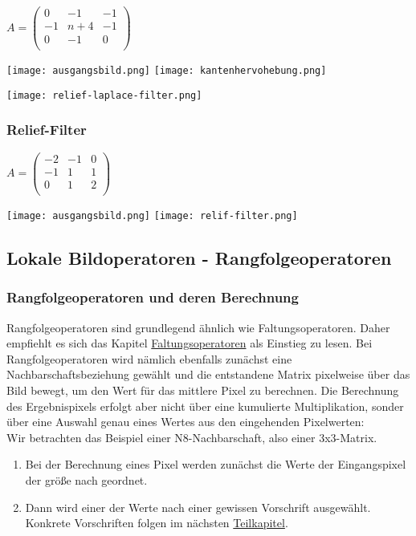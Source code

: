 $
    A
    =
    \begin{pmatrix}
        0  & -1    & -1 \\
        -1 & n + 4 & -1 \\
        0  & -1    & 0  \\
    \end{pmatrix}
$

\texttt{[image: ausgangsbild.png]}
\texttt{[image: kantenhervohebung.png]}

\texttt{[image: relief-laplace-filter.png]}

\subsubsection{Relief-Filter}

$
    A
    =
    \begin{pmatrix}
        -2 & -1 & 0 \\
        -1 & 1  & 1 \\
        0  & 1  & 2 \\
    \end{pmatrix}
$

\texttt{[image: ausgangsbild.png]}
\texttt{[image: relif-filter.png]}

\subsection{Lokale Bildoperatoren - Rangfolgeoperatoren}

\subsubsection{Rangfolgeoperatoren und deren Berechnung}

Rangfolgeoperatoren sind grundlegend ähnlich wie Faltungsoperatoren. Daher empfiehlt es sich das Kapitel \hyperref[sec:faltungsoperatoren]{Faltungsoperatoren} als Einstieg zu lesen. Bei Rangfolgeoperatoren wird nämlich ebenfalls zunächst eine Nachbarschaftsbeziehung gewählt und die entstandene Matrix pixelweise über das Bild bewegt, um den Wert für das mittlere Pixel zu berechnen. Die Berechnung des Ergebnispixels erfolgt aber nicht über eine kumulierte Multiplikation, sonder über eine Auswahl genau eines Wertes aus den eingehenden Pixelwerten:\\

Wir betrachten das Beispiel einer N8-Nachbarschaft, also einer 3x3-Matrix.
\begin{enumerate}
    \item Bei der Berechnung eines Pixel werden zunächst die Werte der Eingangspixel der größe nach geordnet.
    \item Dann wird einer der Werte nach einer gewissen Vorschrift ausgewählt. Konkrete Vorschriften folgen im nächsten \hyperref[sec:types-of-ranking-operators]{Teilkapitel}.
\end{enumerate}

